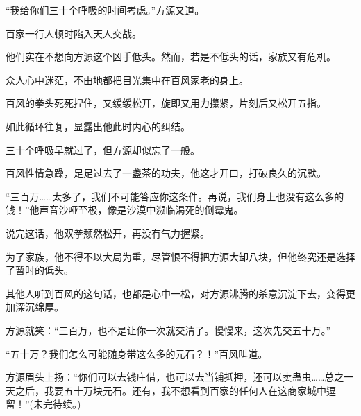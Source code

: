 \begin{this_body}
“我给你们三十个呼吸的时间考虑。”方源又道。

百家一行人顿时陷入天人交战。

他们实在不想向方源这个凶手低头。然而，若是不低头的话，家族又有危机。

众人心中迷茫，不由地都把目光集中在百风家老的身上。

百风的拳头死死捏住，又缓缓松开，旋即又用力攥紧，片刻后又松开五指。

如此循环往复，显露出他此时内心的纠结。

三十个呼吸早就过了，但方源却似忘了一般。

百风性情急躁，足足过去了一盏茶的功夫，他这才开口，打破良久的沉默。

“三百万……太多了，我们不可能答应你这条件。再说，我们身上也没有这么多的钱！”他声音沙哑至极，像是沙漠中濒临渴死的倒霉鬼。

说完这话，他双拳颓然松开，再没有气力握紧。

为了家族，他不得不以大局为重，尽管恨不得把方源大卸八块，但他终究还是选择了暂时的低头。

其他人听到百风的这句话，也都是心中一松，对方源沸腾的杀意沉淀下去，变得更加深沉绵厚。

方源就笑：“三百万，也不是让你一次就交清了。慢慢来，这次先交五十万。”

“五十万？我们怎么可能随身带这么多的元石？！”百风叫道。

方源眉头上扬：“你们可以去钱庄借，也可以去当铺抵押，还可以卖蛊虫……总之一天之后，我要五十万块元石。还有，我不想看到百家的任何人在这商家城中逗留！”(未完待续。)

\end{this_body}

